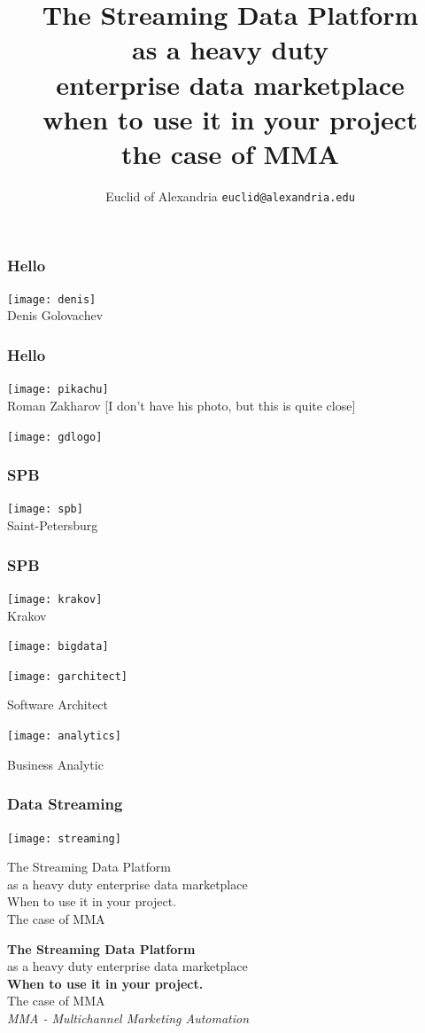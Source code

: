 \documentclass[aspectratio=169, 15pt,usenames,dvipsnames]{beamer}
\title{The Streaming Data Platform\\\small as a heavy duty\\enterprise data marketplace\\\tiny when to use it in your project\\the case of MMA}
\author[Euclid]{Euclid of Alexandria \texttt{euclid@alexandria.edu}}
\begin{document}
  
\begin{titlePage} 
	\titlepage        
\end{titlePage}
	
\begin{gdsw}
	\frametitle{Hello}
	\centering\texttt{[image: denis]}
	\\Denis Golovachev		
\end{gdsw} 
\begin{gdsw}
	\frametitle{Hello}
	\centering\texttt{[image: pikachu]}
	\\Roman Zakharov [I don't have his photo, but this is quite close]
\end{gdsw} 	
\begin{gdsw}
	\centering\texttt{[image: gdlogo]}
\end{gdsw}
\begin{gdsw}
	\frametitle{SPB}
	\centering\texttt{[image: spb]}
	\\Saint-Petersburg
\end{gdsw}
\begin{gdsw}
	\frametitle{SPB}
	\centering\texttt{[image: krakov]}
	\\Krakov
\end{gdsw}
\begin{gdsw}
	\centering\texttt{[image: bigdata]} 
\end{gdsw}
\begin{gdsw}
	\centering\texttt{[image: garchitect]} 
	\par\LARGE
	Software Architect
\end{gdsw}
\begin{gdsw}
	\centering\texttt{[image: analytics]} 
	\par\LARGE
	Business Analytic
\end{gdsw}
\begin{gdsw}
	\frametitle{Data Streaming}
	\centering\texttt{[image: streaming]} 
\end{gdsw}
\begin{gdsw}
	\centering\LARGE
	The Streaming Data Platform\\
	as a heavy duty enterprise data marketplace\\
	When to use it in your project.\\
	The case of MMA
\end{gdsw}
\begin{gdsw}
	\centering\LARGE
	{\bf The Streaming Data Platform}\\
	as a heavy duty enterprise data marketplace\\
	{\bf When to use it in your project.}\\
	The case of MMA
	\pause\\
	{\it\small MMA - Multichannel Marketing Automation}
\end{gdsw}
\end{document}
